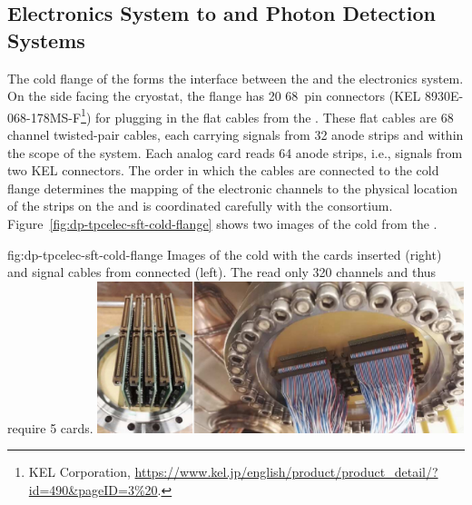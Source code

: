 \subsection{Electronics System to  and Photon Detection Systems}
\label{ssec:dp-tpcelec-intfc-crppmt}

The cold \fdth flange of the  forms the interface between the  and the  electronics system. On the side facing the cryostat, the flange  has \num{20} \num{68}\, pin connectors (KEL 8930E-068-178MS-F\footnote{KEL Corporation\texttrademark{}, \url{https://www.kel.jp/english/product/product_detail/?id=490\&pageID=3\%20}.}) for plugging in the flat cables from the . These flat cables are \num{68}\, channel twisted-pair cables, each carrying signals from \num{32} anode strips and within the scope of the  system. Each analog  card reads \num{64} anode strips, i.e., signals from two KEL connectors. The order in which the cables are connected to the cold flange determines the mapping of the electronic channels to the physical location of the strips on the  and is coordinated carefully with the  consortium. Figure~\ref{fig:dp-tpcelec-sft-cold-flange} shows two images of the cold \fdth from the .

\begin{dunefigure}{fig:dp-tpcelec-sft-cold-flange}
{Images of the   cold \fdth with the  cards inserted (right) and signal cables from  connected (left). The   read only \num{320} channels and thus require \num{5}  cards. }%
\includegraphics[width=0.8\textwidth]{graphics/dp-tpcelec-sft-cold-flange}
\end{dunefigure}

